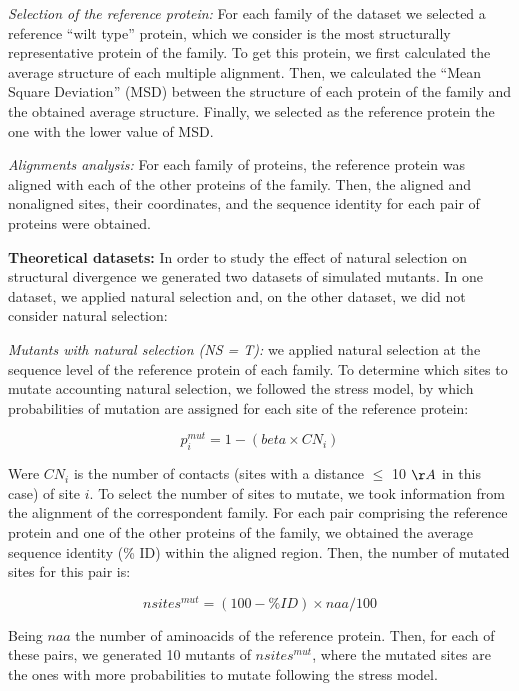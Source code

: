 \documentclass{article}
\begin{document}
{\it Selection of the reference protein:}
For each family of the dataset we selected a reference ``wilt type'' protein, which we consider is the most structurally representative protein of the family. To get this protein, we first calculated the average structure of each multiple alignment. Then, we calculated the ``Mean Square Deviation'' (MSD) between the structure of each protein of the family and the obtained average structure. Finally, we selected as the reference protein the one with the lower value of MSD.

{\it Alignments analysis:}
For each family of proteins, the reference protein was aligned with each of the other proteins of the family. Then, the aligned and nonaligned sites, their coordinates, and the sequence identity for each pair of proteins were obtained. 

{\bf Theoretical datasets:}
In order to study the effect of natural selection on structural divergence we generated two datasets of simulated mutants. In one dataset, we applied natural selection and, on the other dataset, we did not consider natural selection:

{\it Mutants with natural selection (NS = T):} we applied natural selection at the sequence level of the reference protein of each family. To determine which sites to mutate accounting natural selection, we followed the stress model, by which probabilities of mutation are assigned for each site of the reference protein:

\begin{equation}
p^{mut}_{i} = 1 - (beta \times CN_{i})
\end{equation}

Were $CN_{i}$ is the number of contacts (sites with a distance $\leq$ 10 $\AA$ in this case) of site $i$. 
To select the number of sites to mutate, we took information from the alignment of the correspondent family. For each pair comprising the reference protein and one of the other proteins of the family, we obtained the average sequence identity (\% ID) within the aligned region. Then, the number of mutated sites for this pair is: 

\begin{equation}
nsites^{mut} = (100 - \% ID) \times naa / 100
\end{equation}

Being $naa$ the number of aminoacids of the reference protein. 
Then, for each of these pairs, we generated 10 mutants of $nsites^{mut}$, where the mutated sites are the ones with more probabilities to mutate following the stress model.
 
\end{document}

